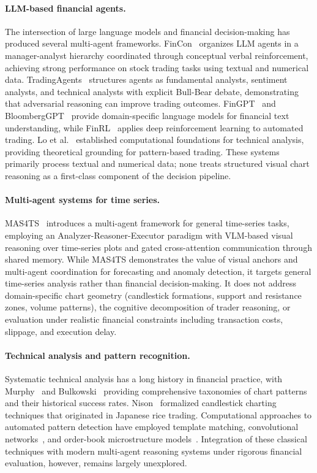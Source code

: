 \paragraph{LLM-based financial agents.}
The intersection of large language models and financial decision-making has produced several multi-agent frameworks. FinCon~\cite{fincon2024} organizes LLM agents in a manager-analyst hierarchy coordinated through conceptual verbal reinforcement, achieving strong performance on stock trading tasks using textual and numerical data. TradingAgents~\cite{tradingagents2024} structures agents as fundamental analysts, sentiment analysts, and technical analysts with explicit Bull-Bear debate, demonstrating that adversarial reasoning can improve trading outcomes. FinGPT~\cite{yang2024fingpt} and BloombergGPT~\cite{wu2023bloomberggpt} provide domain-specific language models for financial text understanding, while FinRL~\cite{liu2021finrl} applies deep reinforcement learning to automated trading. Lo et al.~\cite{lo2000foundations} established computational foundations for technical analysis, providing theoretical grounding for pattern-based trading. These systems primarily process textual and numerical data; none treats structured visual chart reasoning as a first-class component of the decision pipeline.

\paragraph{Multi-agent systems for time series.}
MAS4TS~\cite{mas4ts2025} introduces a multi-agent framework for general time-series tasks, employing an Analyzer-Reasoner-Executor paradigm with VLM-based visual reasoning over time-series plots and gated cross-attention communication through shared memory. While MAS4TS demonstrates the value of visual anchors and multi-agent coordination for forecasting and anomaly detection, it targets general time-series analysis rather than financial decision-making. It does not address domain-specific chart geometry (candlestick formations, support and resistance zones, volume patterns), the cognitive decomposition of trader reasoning, or evaluation under realistic financial constraints including transaction costs, slippage, and execution delay.

\paragraph{Technical analysis and pattern recognition.}
Systematic technical analysis has a long history in financial practice, with Murphy~\cite{murphy1999technical} and Bulkowski~\cite{bulkowski2005encyclopedia} providing comprehensive taxonomies of chart patterns and their historical success rates. Nison~\cite{nison2001japanese} formalized candlestick charting techniques that originated in Japanese rice trading. Computational approaches to automated pattern detection have employed template matching, convolutional networks~\cite{jiang2023cnncharts}, and order-book microstructure models~\cite{cohen2024deeplob}. Integration of these classical techniques with modern multi-agent reasoning systems under rigorous financial evaluation, however, remains largely unexplored.

